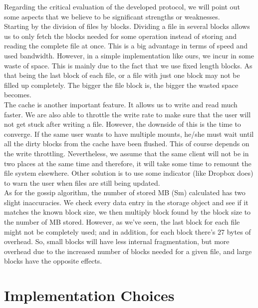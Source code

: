 \documentclass[times,9pt,article]{llncs}
\begin{document}
Regarding the critical evaluation of the developed protocol, we will point out some aspects that we believe to be significant strengths or weaknesses.\\
Starting by the division of files by blocks. Dividing a file in several blocks allows us to only fetch the blocks needed for some operation instead of storing and reading the complete file at once. This is a big advantage in terms of speed and used bandwidth. However, in a simple implementation like ours, we incur in some waste of space. This is mainly due to the fact that we use fixed length blocks. As that being the last block of each file, or a file with just one block may not be filled up completely. The bigger the file block is, the bigger the wasted space becomes.\\
The cache is another important feature. It allows us to write and read much faster. We are also able to throttle the write rate to make sure that the user will not get stuck after writing a file. However, the downside of this is the time to converge. If the same user wants to have multiple mounts, he/she must wait until all the dirty blocks from the cache have been flushed. This of course depends on the write throttling. Nevertheless, we assume that the same client will not be in two places at the same time and therefore, it will take some time to remount the file system elsewhere. Other solution is to use some indicator (like Dropbox does) to warn the user when files are still being updated. \\
As for the gossip algorithm, the number of stored MB (Sm) calculated has two slight inaccuracies. We check every data entry in the storage object and see if it matches the known block size, we then multiply block found by the block size to the number of MB stored. However, as we've seen, the last block for each file might not be completely used; and in addition, for each block there's 27 bytes of overhead. So, small blocks will have less internal fragmentation, but more overhead due to the increased number of blocks needed for a given file, and large blocks have the opposite effects.\\

\section{Implementation Choices}
\end{document}
